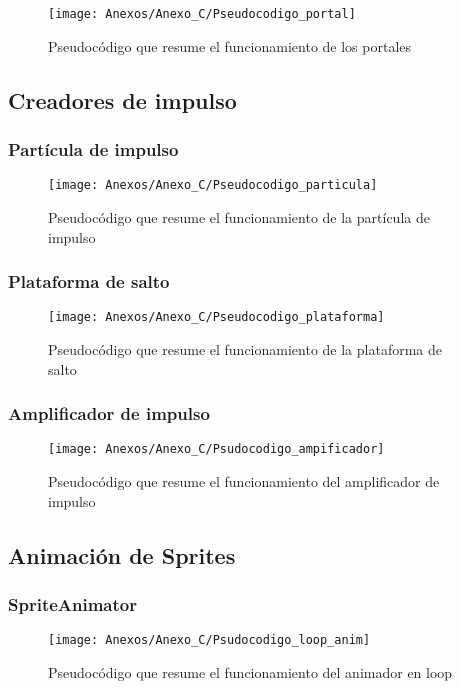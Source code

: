 \begin{figure}[h]
\centering
\texttt{[image: Anexos/Anexo\_C/Pseudocodigo\_portal]}
\caption{Pseudocódigo que resume el funcionamiento de los portales}
\end{figure}
\clearpage

\subsection{Creadores de impulso}
\subsubsection{Partícula de impulso}

\begin{figure}[h]
\centering
\texttt{[image: Anexos/Anexo\_C/Pseudocodigo\_particula]}
\caption{Pseudocódigo que resume el funcionamiento de la partícula de impulso}
\end{figure}

\subsubsection{Plataforma de salto}

\begin{figure}[h]
\centering
\texttt{[image: Anexos/Anexo\_C/Pseudocodigo\_plataforma]}
\caption{Pseudocódigo que resume el funcionamiento de la plataforma de salto}
\end{figure}

\subsubsection{Amplificador de impulso}

\begin{figure}[h]
\centering
\texttt{[image: Anexos/Anexo\_C/Psudocodigo\_ampificador]}
\caption{Pseudocódigo que resume el funcionamiento del amplificador de impulso}
\end{figure}

\clearpage
\subsection{Animación de Sprites}
\subsubsection{SpriteAnimator}

\begin{figure}[h]
\centering
\texttt{[image: Anexos/Anexo\_C/Psudocodigo\_loop\_anim]}
\caption{Pseudocódigo que resume el funcionamiento del animador en loop}
\end{figure}


